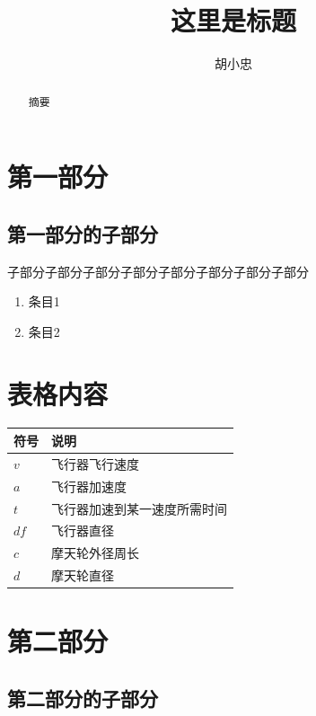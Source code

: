 \documentclass[UTF8,12pt]{ctexart}
\title{\bfseries{这里是标题}}
\author{胡小忠}
\begin{document}
\maketitle

\begin{abstract}
    摘要\cite{基于GPU的大规模无人机编队控制并行仿真方法}
\end{abstract}
\thispagestyle{empty}
\newpage
\setcounter{page}{1}
\section{第一部分}
\subsection{第一部分的子部分}
子部分子部分子部分子部分子部分子部分子部分子部分
\begin{enumerate}
    \item 条目1
    \item 条目2
\end{enumerate}
\section{表格内容}
    \begin{table}[h]
        \vspace{20pt}
        \centering
        \begin{tabular}{p{2cm}p{6cm}}
            \hline
            符号    &   说明 \\
            \hline       
            $v$     &   飞行器飞行速度 \\
            $a$     &   飞行器加速度 \\
            $t$     &   飞行器加速到某一速度所需时间 \\
            $df$    &   飞行器直径 \\
            $c$     &   摩天轮外径周长 \\
            $d$     &   摩天轮直径 \\
            \hline
        \end{tabular}
    \end{table}
\section{第二部分}
\subsection{第二部分的子部分}
\end{document}
